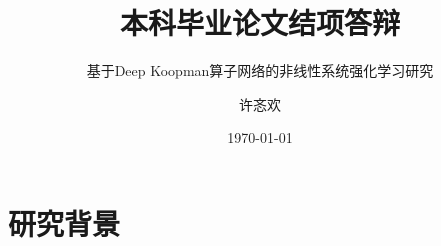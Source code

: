 \documentclass{ldr-simple-gray}
\title{本科毕业论文结项答辩}
\subtitle{基于Deep Koopman算子网络的非线性系统强化学习研究}
\author{许忞欢}
\institute[]
{
导师：赵东东\\
兰州大学\quad 信息科学与工程学院
}
\date{\today}
\begin{document}
\frame{\titlepage}


\section{研究背景}

\end{document}
